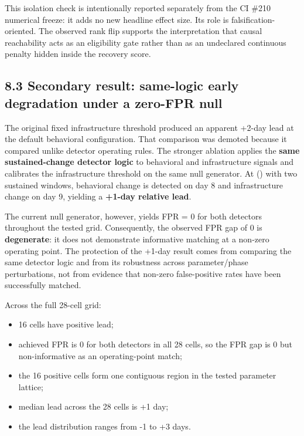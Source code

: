\documentclass[
  11pt,
]{article}
\providecommand{\tightlist}{%
  \setlength{\itemsep}{0pt}\setlength{\parskip}{0pt}}
\begin{document}
This isolation check is intentionally reported separately from the CI
\#210 numerical freeze: it adds no new headline effect size. Its role is
falsification-oriented. The observed rank flip supports the
interpretation that causal reachability acts as an eligibility gate
rather than as an undeclared continuous penalty hidden inside the
recovery score.

\subsection{8.3 Secondary result: same-logic early degradation under a
zero-FPR null}\label{secondary-result-same-logic-zero-fpr}

The original fixed infrastructure threshold produced an apparent +2-day
lead at the default behavioral configuration. That comparison was
demoted because it compared unlike detector operating rules. The
stronger ablation applies the \textbf{same sustained-change detector
logic} to behavioral and infrastructure signals and calibrates the
infrastructure threshold on the same null generator. At
() with two sustained windows, behavioral change is detected
on day 8 and infrastructure change on day 9, yielding a \textbf{+1-day
relative lead}.

The current null generator, however, yields FPR = 0 for both detectors
throughout the tested grid. Consequently, the observed FPR gap of 0 is
\textbf{degenerate}: it does not demonstrate informative matching at a
non-zero operating point. The protection of the +1-day result comes from
comparing the same detector logic and from its robustness across
parameter/phase perturbations, not from evidence that non-zero
false-positive rates have been successfully matched.

Across the full 28-cell grid:

\begin{itemize}
\tightlist
\item
  16 cells have positive lead;
\item
  achieved FPR is 0 for both detectors in all 28 cells, so the FPR gap
  is 0 but non-informative as an operating-point match;
\item
  the 16 positive cells form one contiguous region in the tested
  parameter lattice;
\item
  median lead across the 28 cells is +1 day;
\item
  the lead distribution ranges from -1 to +3 days.
\end{itemize}
\end{document}
